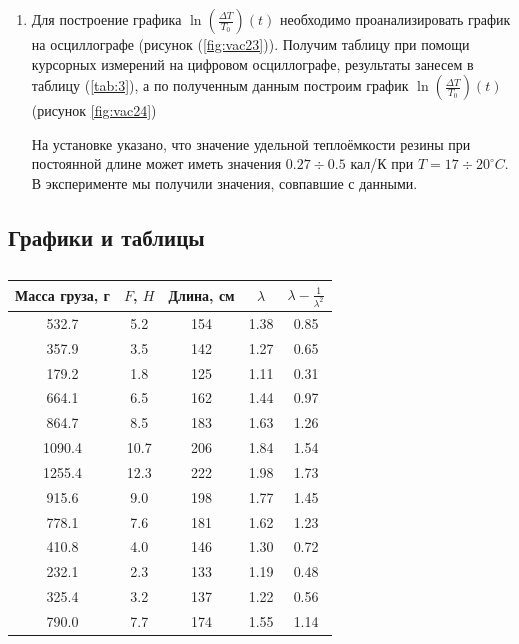 \documentclass[a4paper,11.5pt]{article} %
\begin{document}
\begin{enumerate}
    \item Для построение графика $\ln(\frac{\Delta T}{T_0}) (t)$ необходимо проанализировать график на осциллографе (рисунок (\ref{fig:vac23})). Получим таблицу при помощи курсорных измерений на цифровом осциллографе, результаты занесем в таблицу (\ref{tab:3}), а по полученным данным построим график $\ln(\frac{\Delta T}{T_0}) (t)$ (рисунок \ref{fig:vac24})
  
 
На установке указано, что значение удельной теплоёмкости резины при постоянной длине может иметь значения $0.27\div 0.5$ кал/К при $T = 17 \div 20 ^\circ C$. В эксперименте мы получили значения, совпавшие с данными.

\end{enumerate}

\clearpage

\subsection{Графики и таблицы}

\begin{table}[H]
\begin{center}
\begin{tabular}{|c|c|c|c|c|}
\hline 
Масса груза, г & $F$, $H$ & Длина, см & $\lambda$ & $\lambda - \frac{1}{\lambda^2}$ \\ 
\hline 
532.7 & 5.2 & 154 & 1.38 & 0.85  \\
\hline 
357.9 & 3.5 & 142 & 1.27 & 0.65  \\
\hline 
179.2 & 1.8 & 125 & 1.11 & 0.31  \\
\hline 
664.1 & 6.5 & 162 & 1.44 & 0.97  \\
\hline 
864.7 & 8.5 & 183 & 1.63 & 1.26  \\
\hline 
1090.4 & 10.7 & 206 & 1.84 & 1.54  \\ 
\hline
1255.4 & 12.3 & 222 & 1.98 & 1.73  \\  
\hline 
915.6 & 9.0 & 198 & 1.77 & 1.45  \\ 
\hline 
778.1 & 7.6 & 181 & 1.62 & 1.23  \\
\hline 
410.8 & 4.0 & 146 & 1.30 & 0.72  \\ 
\hline
232.1 & 2.3 & 133 & 1.19 & 0.48  \\
\hline
325.4 & 3.2 & 137 & 1.22 & 0.56  \\  
\hline
790.0 & 7.7 & 174 & 1.55 & 1.14  \\
\hline 
\end{tabular}
\caption{\label{tab:1}}
\end{center}
\end{table} 
\end{document}
